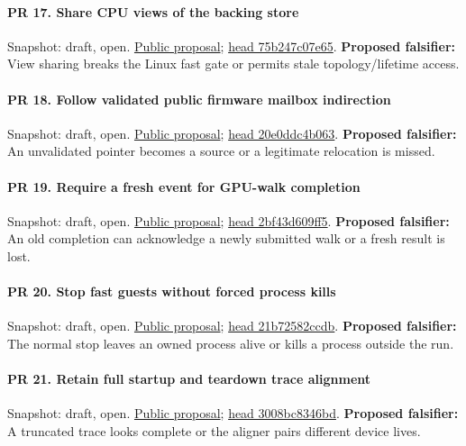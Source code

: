 \paragraph{PR 17. Share CPU views of the backing store}
\readcode Snapshot: draft, open.
\href{\repobase/pull/17}{Public proposal};
\href{\repobase/commit/75b247c07e65cfa48a50141b048170e3827c645f}{head 75b247c07e65}.
\textbf{Proposed falsifier:} View sharing breaks the Linux fast gate or permits stale
  topology/lifetime access.

\paragraph{PR 18. Follow validated public firmware mailbox indirection}
\readcode Snapshot: draft, open.
\href{\repobase/pull/18}{Public proposal};
\href{\repobase/commit/20e0ddc4b0634febb3ed7e97297dc9e31c14705b}{head 20e0ddc4b063}.
\textbf{Proposed falsifier:} An unvalidated pointer becomes a source or a legitimate relocation is
  missed.

\paragraph{PR 19. Require a fresh event for GPU-walk completion}
\readcode Snapshot: draft, open.
\href{\repobase/pull/19}{Public proposal};
\href{\repobase/commit/2bf43d609ff5126d70a1e194c5cb79366a91960a}{head 2bf43d609ff5}.
\textbf{Proposed falsifier:} An old completion can acknowledge a newly submitted walk or a fresh
  result is lost.

\paragraph{PR 20. Stop fast guests without forced process kills}
\readcode Snapshot: draft, open.
\href{\repobase/pull/20}{Public proposal};
\href{\repobase/commit/21b72582ccdbadc771181f6efe0bf05baccffe25}{head 21b72582ccdb}.
\textbf{Proposed falsifier:} The normal stop leaves an owned process alive or kills a process
  outside the run.

\paragraph{PR 21. Retain full startup and teardown trace alignment}
\readcode Snapshot: draft, open.
\href{\repobase/pull/21}{Public proposal};
\href{\repobase/commit/3008bc8346bdfa45162c62c400bffe3f8e7c25e6}{head 3008bc8346bd}.
\textbf{Proposed falsifier:} A truncated trace looks complete or the aligner pairs different device
  lives.

